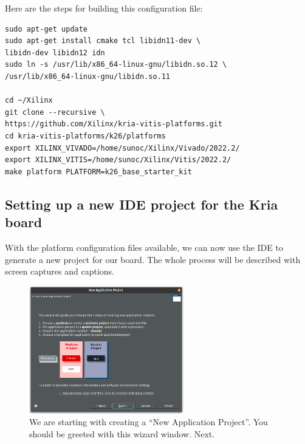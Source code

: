 \documentclass[10pt]{article}
\begin{document}
Here are the steps for building this configuration file:
\begin{tcolorbox}
\begin{verbatim}
sudo apt-get update
sudo apt-get install cmake tcl libidn11-dev \
libidn-dev libidn12 idn
sudo ln -s /usr/lib/x86_64-linux-gnu/libidn.so.12 \
/usr/lib/x86_64-linux-gnu/libidn.so.11

cd ~/Xilinx
git clone --recursive \
https://github.com/Xilinx/kria-vitis-platforms.git
cd kria-vitis-platforms/k26/platforms
export XILINX_VIVADO=/home/sunoc/Xilinx/Vivado/2022.2/
export XILINX_VITIS=/home/sunoc/Xilinx/Vitis/2022.2/
make platform PLATFORM=k26_base_starter_kit
\end{verbatim}
\end{tcolorbox}


\subsection{Setting up a new IDE project for the Kria board}
\label{sec:setting-up-new}
With the platform configuration files available, we can now use the IDE to generate a
new project for our board. The whole process will be described with screen captures and
captions.

\begin{figure}[H]
  \centering
  \includegraphics[width=0.6\textwidth]{./img/vitis_new/project1}
  \caption{We are starting with creating a ``New Application Project''. You should be greeted with this wizard window. Next.}
  \label{fig:project1}
\end{figure}
\end{document}
